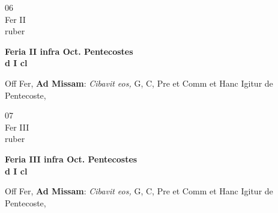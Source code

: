 \documentclass[10pt, openany]{book}
\begin{document}
        \begin{center}
            \begin{minipage}{3.5in}
                \vspace{2em}
                \begin{minipage}{0.5in}
                    {\Huge 06} \\
                    {\normalsize Fer II} \\
                    {\normalsize ruber}
                \end{minipage}
                \begin{minipage}{3.0in}
                    \textbf{ \large Feria II infra Oct. Pentecostes \\
                    \textnormal{\normalsize d I cl}} \\ 
                \end{minipage}
                \begin{justify}Off Fer, \textbf{Ad Missam}: \textit{Cibavit eos,} G, C, Pre et Comm et Hanc Igitur de Pentecoste,  
                \end{justify}
            \end{minipage}
        \end{center}
    
        \begin{center}
            \begin{minipage}{3.5in}
                \vspace{2em}
                \begin{minipage}{0.5in}
                    {\Huge 07} \\
                    {\normalsize Fer III} \\
                    {\normalsize ruber}
                \end{minipage}
                \begin{minipage}{3.0in}
                    \textbf{ \large Feria III infra Oct. Pentecostes \\
                    \textnormal{\normalsize d I cl}} \\ 
                \end{minipage}
                \begin{justify}Off Fer, \textbf{Ad Missam}: \textit{Cibavit eos,} G, C, Pre et Comm et Hanc Igitur de Pentecoste,  
                \end{justify}
            \end{minipage}
        \end{center}
    
\end{document}
